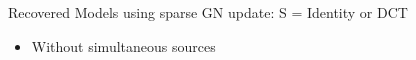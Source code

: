 \documentclass[12pt]{beamer}
\begin{document}
\begin{frame}{Recovered Models using sparse GN update: S = Identity or DCT }
\begin{itemize}
  \item Without simultaneous sources
\end{itemize}
\begin{figure}

\end{figure}

\end{frame}
\end{document}
